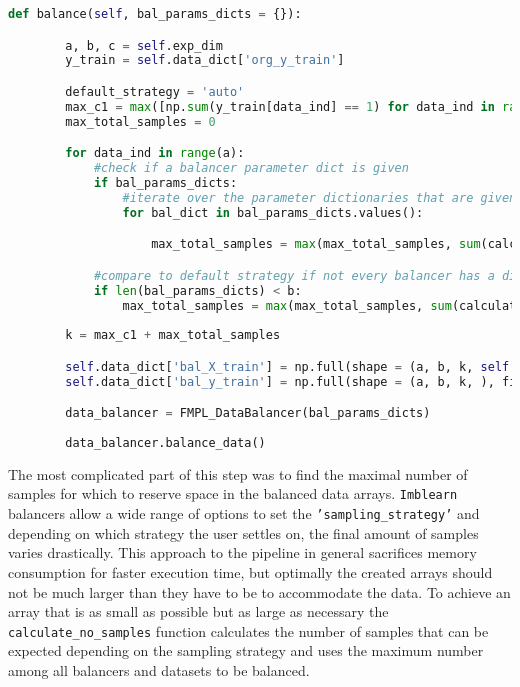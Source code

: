 \begin{lstlisting}[language=Python, numbers=none]
    def balance(self, bal_params_dicts = {}):

        a, b, c = self.exp_dim
        y_train = self.data_dict['org_y_train']

        default_strategy = 'auto'
        max_c1 = max([np.sum(y_train[data_ind] == 1) for data_ind in range(a)])
        max_total_samples = 0

        for data_ind in range(a):
            #check if a balancer parameter dict is given
            if bal_params_dicts:
                #iterate over the parameter dictionaries that are given
                for bal_dict in bal_params_dicts.values():

                    max_total_samples = max(max_total_samples, sum(calculate_no_samples(y_train[data_ind], bal_dict['sampling_strategy']).values()))

            #compare to default strategy if not every balancer has a dict
            if len(bal_params_dicts) < b:
                max_total_samples = max(max_total_samples, sum(calculate_no_samples(y_train[data_ind], default_strategy).values()))
        
        k = max_c1 + max_total_samples

        self.data_dict['bal_X_train'] = np.full(shape = (a, b, k, self.d), fill_value = np.nan)
        self.data_dict['bal_y_train'] = np.full(shape = (a, b, k, ), fill_value = np.nan)

        data_balancer = FMPL_DataBalancer(bal_params_dicts)
        
        data_balancer.balance_data()
\end{lstlisting}

The most complicated part of this step was to find the maximal number of samples for which to reserve space in the balanced data arrays.
\texttt{Imblearn} balancers allow a wide range of options to set the \texttt{'sampling_strategy'} and depending on which strategy the user settles on,
the final amount of samples varies drastically. This approach to the pipeline in general sacrifices memory consumption for faster execution time, 
but optimally the created arrays should not be much larger than they have to be to accommodate the data. 
To achieve an array that is as small as possible but as large as necessary the \texttt{calculate_no_samples} function calculates the number of samples
that can be expected depending on the sampling strategy and uses the maximum number among all balancers and datasets to be balanced.

